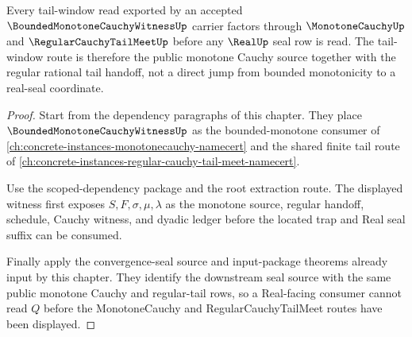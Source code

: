 \begin{theorem}
\label{thm:bounded-monotone-cauchy-witness-tail-window-lock}
Every tail-window read exported by an accepted $\BoundedMonotoneCauchyWitnessUp$ carrier factors through $\MonotoneCauchyUp$ and $\RegularCauchyTailMeetUp$ before any $\RealUp$ seal row is read. The tail-window route is therefore the public monotone Cauchy source together with the regular rational tail handoff, not a direct jump from bounded monotonicity to a real-seal coordinate.
\end{theorem}
\begin{proof}
Start from the dependency paragraphs of this chapter. They place $\BoundedMonotoneCauchyWitnessUp$ as the bounded-monotone consumer of \autoref{ch:concrete-instances-monotonecauchy-namecert} and the shared finite tail route of \autoref{ch:concrete-instances-regular-cauchy-tail-meet-namecert}.

Use the scoped-dependency package and the root extraction route. The displayed witness first exposes $S,F,\sigma,\mu,\lambda$ as the monotone source, regular handoff, schedule, Cauchy witness, and dyadic ledger before the located trap and Real seal suffix can be consumed.

Finally apply the convergence-seal source and input-package theorems already input by this chapter. They identify the downstream seal source with the same public monotone Cauchy and regular-tail rows, so a Real-facing consumer cannot read $Q$ before the MonotoneCauchy and RegularCauchyTailMeet routes have been displayed.
\end{proof}

